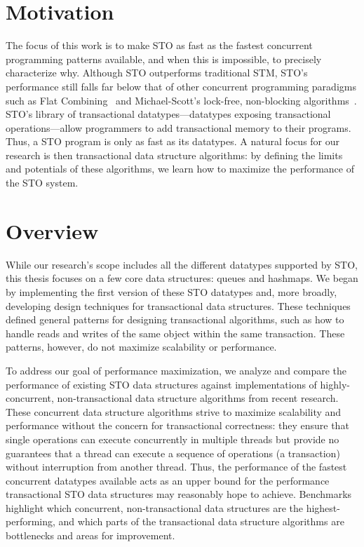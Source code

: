 \section{Motivation}
The focus of this work is to make STO as fast as the fastest concurrent programming patterns available, and when this is impossible, to precisely characterize why. Although STO outperforms traditional STM, STO’s performance still falls far below that of other concurrent programming paradigms such as Flat Combining~\cite{flatcombining} and Michael-Scott's lock-free, non-blocking algorithms~\cite{queue1}. STO’s library of transactional datatypes---datatypes exposing transactional operations---allow programmers to add transactional memory to their programs. Thus, a STO program is only as fast as its datatypes. A natural focus for our research is then transactional data structure algorithms: by defining the limits and potentials of these algorithms, we learn how to maximize the performance of the STO system.

\section{Overview}
While our research's scope includes all the different datatypes supported by STO, this thesis focuses on a few core data structures: queues and hashmaps. We began by implementing the first version of these STO datatypes and, more broadly, developing design techniques for transactional data structures. These techniques defined general patterns for designing transactional algorithms, such as how to handle reads and writes of the same object within the same transaction. These patterns, however, do not maximize scalability or performance.

To address our goal of performance maximization, we analyze and compare the performance of existing STO data structures against implementations of highly-concurrent, non-transactional data structure algorithms from recent research. These concurrent data structure algorithms strive to maximize scalability and performance without the concern for transactional correctness: they ensure that single operations can execute concurrently in multiple threads but provide no guarantees that a thread can execute a sequence of operations (a transaction) without interruption from another thread.
Thus, the performance of the fastest concurrent datatypes available acts as an upper bound for the performance transactional STO data structures may reasonably hope to achieve. Benchmarks highlight which concurrent, non-transactional data structures are the highest-performing, and which parts of the transactional data structure algorithms are bottlenecks and areas for improvement. 

